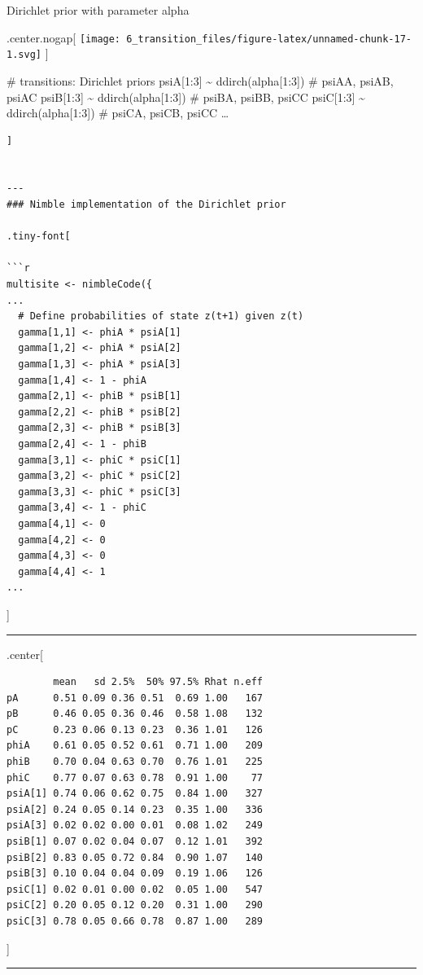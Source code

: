 \documentclass[
]{article}
\begin{document}
Dirichlet prior with parameter alpha

.center.nogap{[}
\texttt{[image: 6\_transition\_files/figure-latex/unnamed-chunk-17-1.svg]}
{]}

\# transitions: Dirichlet priors psiA{[}1:3{]} \textasciitilde{}
ddirch(alpha{[}1:3{]}) \# psiAA, psiAB, psiAC psiB{[}1:3{]}
\textasciitilde{} ddirch(alpha{[}1:3{]}) \# psiBA, psiBB, psiCC
psiC{[}1:3{]} \textasciitilde{} ddirch(alpha{[}1:3{]}) \# psiCA, psiCB,
psiCC \ldots{}

\begin{verbatim}
]


---
### Nimble implementation of the Dirichlet prior

.tiny-font[

```r
multisite <- nimbleCode({
...
  # Define probabilities of state z(t+1) given z(t)
  gamma[1,1] <- phiA * psiA[1]
  gamma[1,2] <- phiA * psiA[2]
  gamma[1,3] <- phiA * psiA[3]
  gamma[1,4] <- 1 - phiA
  gamma[2,1] <- phiB * psiB[1]
  gamma[2,2] <- phiB * psiB[2]
  gamma[2,3] <- phiB * psiB[3]
  gamma[2,4] <- 1 - phiB
  gamma[3,1] <- phiC * psiC[1]
  gamma[3,2] <- phiC * psiC[2]
  gamma[3,3] <- phiC * psiC[3]
  gamma[3,4] <- 1 - phiC
  gamma[4,1] <- 0
  gamma[4,2] <- 0
  gamma[4,3] <- 0
  gamma[4,4] <- 1
...
\end{verbatim}

{]}

\begin{center}\rule{0.5\linewidth}{0.5pt}\end{center}

.center{[}

\begin{verbatim}
        mean   sd 2.5%  50% 97.5% Rhat n.eff
pA      0.51 0.09 0.36 0.51  0.69 1.00   167
pB      0.46 0.05 0.36 0.46  0.58 1.08   132
pC      0.23 0.06 0.13 0.23  0.36 1.01   126
phiA    0.61 0.05 0.52 0.61  0.71 1.00   209
phiB    0.70 0.04 0.63 0.70  0.76 1.01   225
phiC    0.77 0.07 0.63 0.78  0.91 1.00    77
psiA[1] 0.74 0.06 0.62 0.75  0.84 1.00   327
psiA[2] 0.24 0.05 0.14 0.23  0.35 1.00   336
psiA[3] 0.02 0.02 0.00 0.01  0.08 1.02   249
psiB[1] 0.07 0.02 0.04 0.07  0.12 1.01   392
psiB[2] 0.83 0.05 0.72 0.84  0.90 1.07   140
psiB[3] 0.10 0.04 0.04 0.09  0.19 1.06   126
psiC[1] 0.02 0.01 0.00 0.02  0.05 1.00   547
psiC[2] 0.20 0.05 0.12 0.20  0.31 1.00   290
psiC[3] 0.78 0.05 0.66 0.78  0.87 1.00   289
\end{verbatim}

{]}

\begin{center}\rule{0.5\linewidth}{0.5pt}\end{center}
\end{document}
